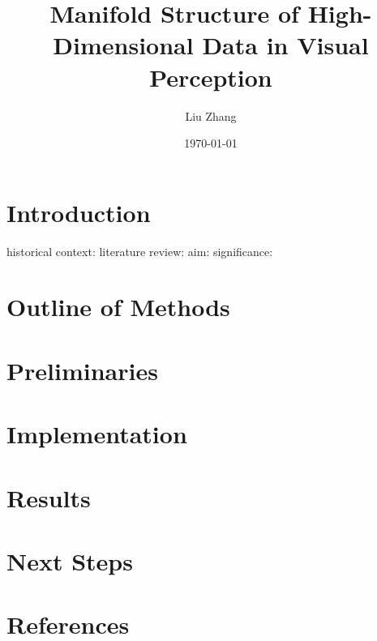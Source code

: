 \documentclass{article}
\title{Manifold Structure of High-Dimensional Data in Visual Perception}
\author{Liu Zhang}
\date{\today}
\begin{document}
\maketitle
\section{Introduction}
historical context:
literature review:
aim:
significance:

\section{Outline of Methods}

\section{Preliminaries}

\section{Implementation}

\section{Results}

\section{Next Steps}

\section{References}


\end{document}
